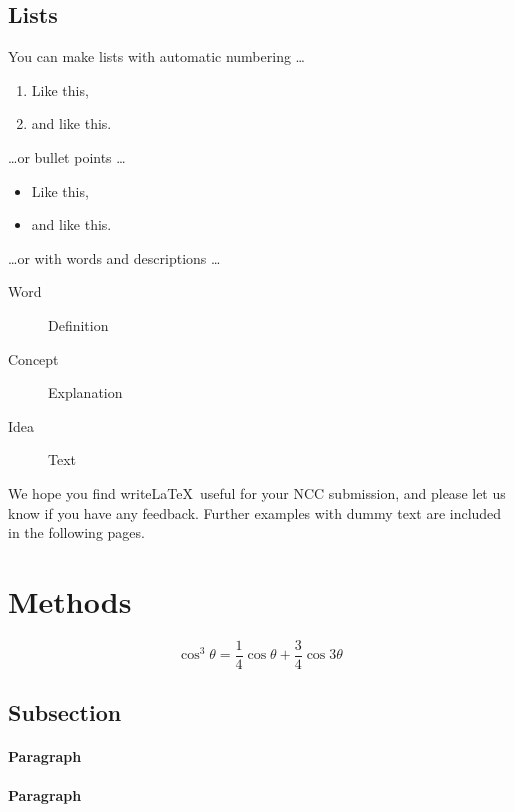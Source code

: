 \documentclass[fleqn,10pt]{ncc} %
\begin{document}
\subsection{Lists}

You can make lists with automatic numbering \dots

\begin{enumerate}[noitemsep] 
\item Like this,
\item and like this.
\end{enumerate}
\dots or bullet points \dots
\begin{itemize}[noitemsep] 
\item Like this,
\item and like this.
\end{itemize}
\dots or with words and descriptions \dots
\begin{description}
\item[Word] Definition
\item[Concept] Explanation
\item[Idea] Text
\end{description}

We hope you find write\LaTeX\ useful for your NCC submission, and please let us know if you have any feedback. Further examples with dummy text are included in the following pages.

\section{Methods}

\lipsum[4] %

\begin{equation}
\cos^3 \theta =\frac{1}{4}\cos\theta+\frac{3}{4}\cos 3\theta
\label{eq:refname2}
\end{equation}

\lipsum[5] %

\subsection{Subsection}

\lipsum[6] %

\paragraph{Paragraph} \lipsum[7] %
\paragraph{Paragraph} \lipsum[8] %
\end{document}
